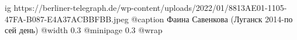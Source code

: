  
 
 
 
 

\ifcmt
  ig https://berliner-telegraph.de/wp-content/uploads/2022/01/8813AE01-1105-47FA-B087-E4A37ACBBFBB.jpeg
  @caption Фаина Савенкова (Луганск 2014-по сей день)
  @width 0.3
  @minipage 0.3
  @wrap \parpic[r]
\fi
